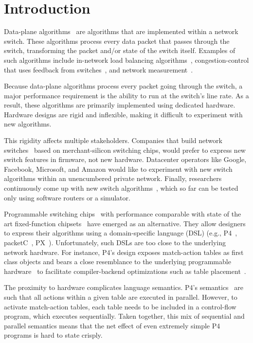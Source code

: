 \section{Introduction}
\label{s:intro}

Data-plane algorithms~\cite{cestan} are algorithms that are implemented within
a network switch. These algorithms process every data packet that passes
through the switch, transforming the packet and/or state of the switch itself.
Examples of such algorithms include in-network load balancing
algorithms~\cite{conga, ecmp}, congestion-control that uses feedback from
switches~\cite{xcp, rcp, pdq, dctcp}, and network measurement~\cite{opensketch,
bitmap_george, elephant_george}.

Because data-plane algorithms process every packet going through the switch, a
major performance requirement is the ability to run at the switch's line rate.
As a result, these algorithms are primarily implemented using dedicated
hardware. Hardware designs are rigid and inflexible, making it difficult to
experiment with new algorithms.

This rigidity affects multiple stakeholders. Companies that build network
switches~\cite{cisco_nexus, dell_force10, arista_7050} based on
merchant-silicon switching chips, would prefer to express new switch features
in firmware, not new hardware.  Datacenter operators like Google, Facebook,
Microsoft, and Amazon would like to experiment with new switch algorithms
within an unencumbered private network.  Finally, researchers continuously come
up with new switch algorithms~\cite{xcp, codel, d3, detail, pdq}, which so far
can be tested only using software routers or a simulator.

Programmable switching chips~\cite{flexpipe, xpliant, rmt} with performance
comparable with state of the art fixed-function chipsets~\cite{trident,
tomahawk, mellanox} have emerged as an alternative.  They allow designers to
express their algorithms using a domain-specific language (DSL) (e.g.,
P4~\cite{p4}, packetC~\cite{packetc}, PX~\cite{px}).  Unfortunately, such DSLs
are too close to the underlying network hardware.  For instance, P4's design
exposes match-action tables as first class objects and bears a close
resemblance to the underlying programmable hardware~\cite{flexpipe, rmt} to
facilitate compiler-backend optimizations such as table
placement~\cite{lavanya_compiler}.

The proximity to hardware complicates language semantics. P4's
semantics~\cite{p4spec} are such that all actions within a given table are
executed in parallel. However, to activate match-action tables, each table
needs to be included in a control-flow program, which executes sequentially.
Taken together, this mix of sequential and parallel semantics means that
the net effect of even extremely simple P4 programs is hard to state crisply.

